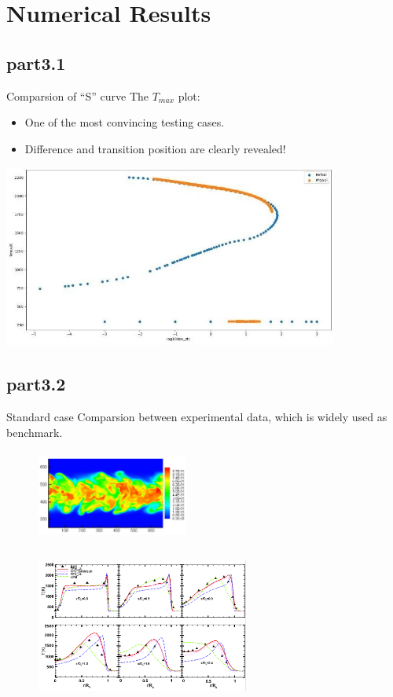 \section{Numerical Results}
	\subsection{part3.1}
		\begin{xframe}{Comparsion of ``S'' curve}
			The $T_{max}$ plot:
			\begin{itemize}
				\item
					One of the most convincing testing cases.
				\item
					Difference and transition position are clearly revealed! 
			\end{itemize}			
			\includegraphics[width=11cm, height=6cm]{../pic/Tmax.jpg}	
		\end{xframe}
	\subsection{part3.2}
		\begin{xframe}{Standard case}
			Comparsion between experimental data, which is widely used as benchmark\cite{RN14}.
			\begin{figure}
				\begin{minipage}{3.5cm}
					\centering
					\includegraphics[height=3cm, width=5cm]{../pic/slice.png}
				\end{minipage}%
				\begin{minipage}{7.5cm}
					\centering
					\includegraphics[height=5.5cm, width=7cm]{../pic/line.png}
				\end{minipage}%
			\end{figure}
		\end{xframe}

